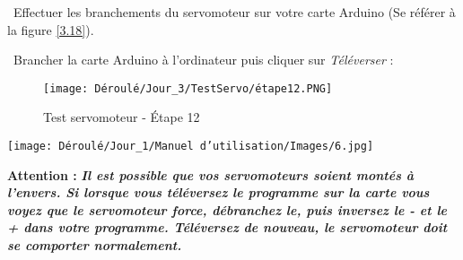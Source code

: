 \begin{flushleft}
\textbullet \, Effectuer les branchements du servomoteur sur votre carte Arduino (Se référer à la figure \ref{3.18}).\\

\newpage

\textbullet \, Brancher la carte Arduino à l'ordinateur puis cliquer sur \textit{Téléverser} :
\begin{figure}[!h]
    \centering
    \texttt{[image: Déroulé/Jour\_3/TestServo/étape12.PNG]}
    \caption[\'Etape 12]{Test servomoteur - \'Etape 12}
    \label{fig:my_label}
\end{figure}

\begin{multicols}{2}
    \texttt{[image: Déroulé/Jour\_1/Manuel d'utilisation/Images/6.jpg]}
    
    \columnbreak
    
    \textbf{\large Attention : }\textbf{\textit{Il est possible que vos servomoteurs soient montés à l'envers. Si lorsque vous téléversez le programme sur la carte vous voyez que le servomoteur force, débranchez le, puis inversez le - et le + dans votre programme. Téléversez de nouveau, le servomoteur doit se comporter normalement.}}
\end{multicols}

\end{flushleft}